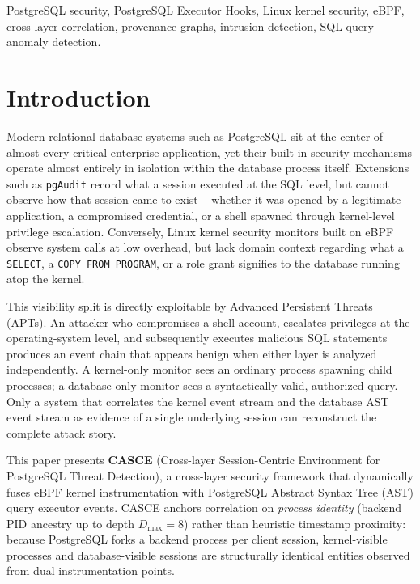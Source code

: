 \documentclass[conference]{IEEEtran}
\begin{document}
\begin{IEEEkeywords}
PostgreSQL security, PostgreSQL Executor Hooks, Linux kernel security, eBPF, cross-layer correlation, provenance graphs, intrusion detection, SQL query anomaly detection.
\end{IEEEkeywords}

\section{Introduction}

Modern relational database systems such as PostgreSQL sit at the center of almost every critical enterprise application, yet their built-in security mechanisms operate almost entirely in isolation within the database process itself. Extensions such as \texttt{pgAudit} record what a session executed at the SQL level, but cannot observe how that session came to exist -- whether it was opened by a legitimate application, a compromised credential, or a shell spawned through kernel-level privilege escalation. Conversely, Linux kernel security monitors built on eBPF observe system calls at low overhead, but lack domain context regarding what a \texttt{SELECT}, a \texttt{COPY FROM PROGRAM}, or a role grant signifies to the database running atop the kernel.

This visibility split is directly exploitable by Advanced Persistent Threats (APTs). An attacker who compromises a shell account, escalates privileges at the operating-system level, and subsequently executes malicious SQL statements produces an event chain that appears benign when either layer is analyzed independently. A kernel-only monitor sees an ordinary process spawning child processes; a database-only monitor sees a syntactically valid, authorized query. Only a system that correlates the kernel event stream and the database AST event stream as evidence of a single underlying session can reconstruct the complete attack story.

This paper presents \textbf{CASCE} (Cross-layer Session-Centric Environment for PostgreSQL Threat Detection), a cross-layer security framework that dynamically fuses eBPF kernel instrumentation with PostgreSQL Abstract Syntax Tree (AST) query executor events. CASCE anchors correlation on \emph{process identity} (backend PID ancestry up to depth $D_{\text{max}}=8$) rather than heuristic timestamp proximity: because PostgreSQL forks a backend process per client session, kernel-visible processes and database-visible sessions are structurally identical entities observed from dual instrumentation points.
\end{document}
